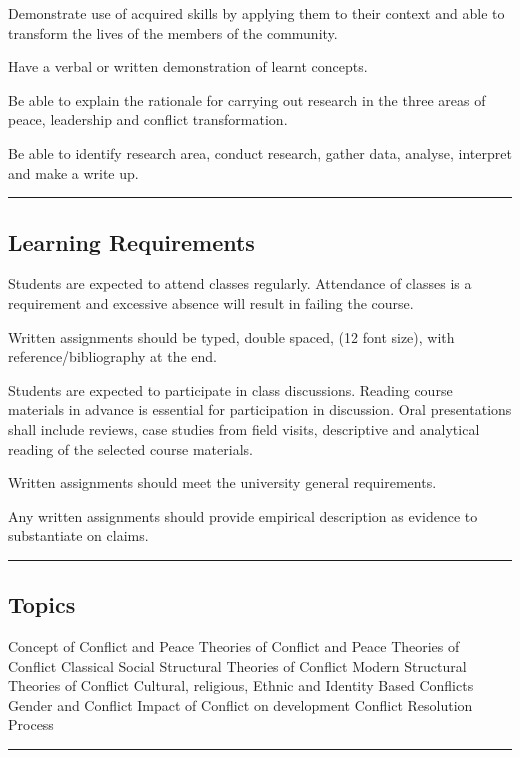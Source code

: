 \begin{outline}
    \1      Demonstrate use of acquired skills by applying them to their context and able to transform the lives of the members of the community.

    \1  	Have a verbal or written demonstration of learnt concepts.

    \1  	Be able to explain the rationale for carrying out research in the three areas of peace, leadership and conflict transformation.

    \1  	Be able to identify research area, conduct research, gather data, analyse, interpret and make a write up.

\end{outline}
\vspace{2ex}\hrule\vspace{2ex}

\subsection*{Learning Requirements}
\begin{outline}
    \1      Students are expected to attend classes regularly. Attendance of classes is a requirement and excessive absence will result in failing the course.

    \1  	Written assignments should be typed, double spaced, (12 font size), with reference/bibliography at the end.

    \1  	Students are expected to participate in class discussions. Reading course materials in advance is essential for participation in discussion. Oral presentations shall include reviews, case studies from field visits, descriptive and analytical reading of the selected course materials.

    \1  	Written assignments should meet the university general requirements.

    \1  	Any written assignments should provide empirical description as evidence to substantiate on claims.

\end{outline}
\vspace{2ex}\hrule\vspace{2ex}



\subsection*{Topics}
\begin{outline}
    \1 Concept of Conflict and Peace
    \1 Theories of Conflict and Peace
    \1 Theories of Conflict
    \1 Classical Social Structural Theories of Conflict
    \1 Modern Structural Theories of Conflict
    \1 Cultural, religious, Ethnic and Identity Based Conflicts
    \1 Gender and Conflict
    \1 Impact of Conflict on development
    \1 Conflict Resolution Process

\end{outline}
\vspace{2ex} \hrule\vspace{2ex}


